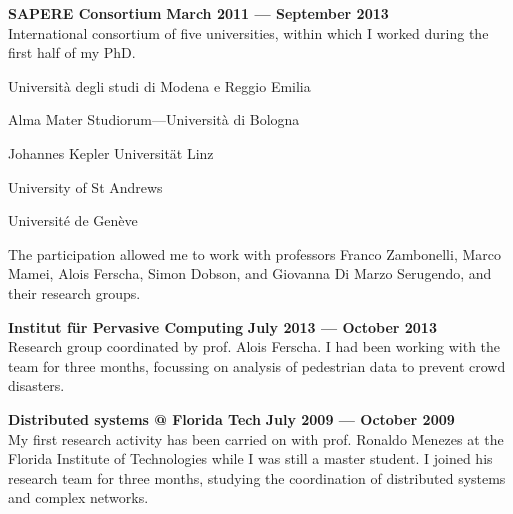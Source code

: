 \halfblankline{}

\textbf{SAPERE Consortium} \hfill \textbf{March 2011 --- September 2013}\\
International consortium of five universities, within which I worked during the first half of my PhD.
\begin{innerlist}
    \item Università degli studi di Modena e Reggio Emilia
    \item Alma Mater Studiorum---Università di Bologna
    \item Johannes Kepler Universität Linz
    \item University of St Andrews
    \item Université de Genève
\end{innerlist}
The participation allowed me to work with professors Franco Zambonelli, Marco Mamei, Alois Ferscha, Simon Dobson, and Giovanna Di Marzo Serugendo, and their research groups.

\halfblankline{}

\textbf{Institut für Pervasive Computing} \hfill \textbf{July 2013 --- October 2013}\\
Research group coordinated by prof. Alois Ferscha. I had been working with the team for three months, focussing on analysis of pedestrian data to prevent crowd disasters.

\halfblankline{}

\textbf{Distributed systems @ Florida Tech} \hfill \textbf{July 2009 --- October 2009}\\
My first research activity has been carried on with prof. Ronaldo Menezes at the Florida Institute of Technologies while I was still a master student. I joined his research team for three months, studying the coordination of distributed systems and complex networks.

\halfblankline{}

